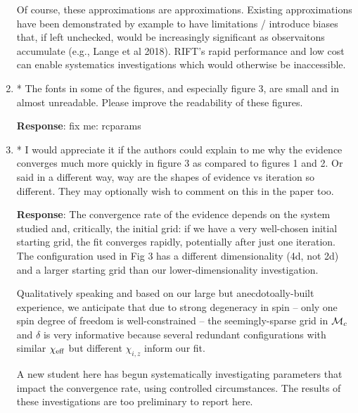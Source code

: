 \documentclass[onecolumn]{revtex4}
\newcommand\editremark[1]{{\color{red} #1}}
\begin{document}
\begin{enumerate}
Of course, these approximations are approximations.  Existing approximations  have been demonstrated by example to have limitations /
introduce biases that, if left unchecked, would be increasingly significant as observaitons accumulate (e.g., Lange et
al 2018).  RIFT's rapid performance  and low cost can enable systematics investigations which would otherwise be inaccessible.


\item * The fonts in some of the figures, and especially figure 3, are small
and in almost unreadable. Please improve the readability of these
figures.

\noindent \textbf{Response}:  \editremark{fix me: rcparams}


\item * I would appreciate it if the authors could explain to me why the
evidence converges much more quickly in figure 3 as compared to
figures 1 and 2. Or said in a different way, way are the shapes of
evidence vs iteration so different. They may optionally wish to
comment on this in the paper too.

\noindent \textbf{Response}:  The convergence rate of the evidence depends on the system studied and, critically, the
initial grid: if we have a very well-chosen initial starting grid, the fit  converges rapidly, potentially after just
one iteration.  The configuration used
in Fig 3 has a different dimensionality (4d, not 2d) and a larger starting  grid than our lower-dimensionality investigation.

Qualitatively speaking and based on our large but anecdotoally-built experience, we anticipate that  due to strong degeneracy in
spin -- only one spin degree of freedom is well-constrained -- the seemingly-sparse grid in ${\cal M}_c$ and $\delta$ is very
informative because several redundant configurations with similar $\chi_{\rm eff}$ but different $\chi_{i,z}$ inform our
fit.   

A new  student here has begun systematically investigating parameters that impact the convergence rate, using controlled
circumstances. The results of these investigations are too preliminary to report here.

\end{enumerate}
\end{document}
